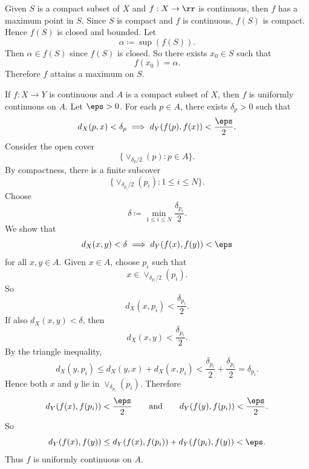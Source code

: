\begin{theorem}{
	Given $S$ is a compact subset of $X$ and $f:X\to\rr$ is continuous, then $f$ has a maximum point in $S$.
}
	Since $S$ is compact and $f$ is continuous, $f(S)$ is compact.
	Hence $f(S)$ is closed and bounded.
	Let
	\[
		\alpha \coloneqq \sup(f(S)).
	\]
	Then $\alpha\in f(S)$ since $f(S)$ is closed.
	So there exists $x_0\in S$ such that
	\[
		f(x_0) = \alpha.
	\]
	Therefore $f$ attains a maximum on $S$.
\end{theorem}

\begin{theorem}{
	If $f:X\to Y$ is continuous and $A$ is a compact subset of $X$, then $f$ is uniformly continuous on $A$.
}
	Let $\eps > 0$.
	For each $p\in A$, there exists $\delta_p > 0$ such that
	\[
		d_X(p,x) < \delta_p \implies d_Y(f(p),f(x)) < \frac{\eps}{2}.
	\]
	Consider the open cover
	\[
		\{\vee_{\delta_p/2}(p) : p\in A\}.
	\]
	By compactness, there is a finite subcover
	\[
		\{\vee_{\delta_{p_i}/2}(p_i) : 1 \leq i\leq N\}.
	\]
	Choose
	\[
		\delta \coloneqq \min_{1\leq i\leq N}\frac{\delta_{p_i}}{2}.
	\]
	We show that
	\[
		d_X(x,y) < \delta \implies d_Y(f(x),f(y)) < \eps
	\]
	for all $x,y\in A$.
	Given $x\in A$, choose $p_i$ such that
	\[
		x\in \vee_{\delta_{p_i}/2}(p_i).
	\]
	So
	\[
		d_X(x,p_i) < \frac{\delta_{p_i}}{2}.
	\]
	If also $d_X(x,y) < \delta$, then
	\[
		d_X(x,y) < \frac{\delta_{p_i}}{2}.
	\]
	By the triangle inequality,
	\[
		d_X(y,p_i) \leq d_X(y,x) + d_X(x,p_i) < \frac{\delta_{p_i}}{2} + \frac{\delta_{p_i}}{2} = \delta_{p_i}.
	\]
	Hence both $x$ and $y$ lie in $\vee_{\delta_{p_i}}(p_i)$.
	Therefore
	\[
		d_Y(f(x),f(p_i)) < \frac{\eps}{2}
		\qquad\text{and}\qquad
		d_Y(f(y),f(p_i)) < \frac{\eps}{2}.
	\]
	So
	\[
		d_Y(f(x),f(y)) \leq d_Y(f(x),f(p_i)) + d_Y(f(p_i),f(y)) < \eps.
	\]
	Thus $f$ is uniformly continuous on $A$.
\end{theorem}